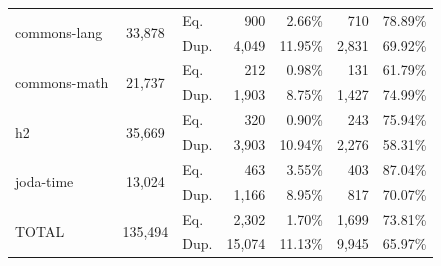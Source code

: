 \begin{table}[t]
\begin{tabular}{|l|c|l|r|r|r|c|}
\multirow{2}{*}{commons-lang}          & \multirow{2}{*}{33,878}  & Eq.                    & 900                              & 2.66\%                           & 710                  & 78.89\%                 \\ \cline{3-7} 
                                       &                         & Dup.                     & 4,049                             & 11.95\%                          & 2,831                 & 69.92\%                 \\ \hline
\multirow{2}{*}{commons-math}          & \multirow{2}{*}{21,737}  & Eq.                    & 212                              & 0.98\%                           & 131                  & 61.79\%                 \\ \cline{3-7} 
                                       &                         & Dup.                     & 1,903                             & 8.75\%                           & 1,427                 & 74.99\%                 \\ \hline
\multirow{2}{*}{h2}                    & \multirow{2}{*}{35,669}  & Eq.                    & 320                              & 0.90\%                           & 243                  & 75.94\%                 \\ \cline{3-7} 
                                       &                         & Dup.                     & 3,903                             & 10.94\%                          & 2,276                 & 58.31\%                 \\ \hline
\multirow{2}{*}{joda-time}             & \multirow{2}{*}{13,024}  & Eq.                    & 463                              & 3.55\%                           & 403                  & 87.04\%                 \\ \cline{3-7} 
                                       &                         & Dup.                     & 1,166                             & 8.95\%                           & 817                  & 70.07\%                 \\ \hline
\multirow{2}{*}{TOTAL}                 & \multirow{2}{*}{135,494} & Eq.                    & 2,302                             & 1.70\%                           & 1,699                 & 73.81\%                 \\ \cline{3-7} 
                                       &                         & Dup.                     & 15,074                            & 11.13\%                          & 9,945                 & 65.97\%                 \\ \hline
\end{tabular}
\end{table}
\normalsize

